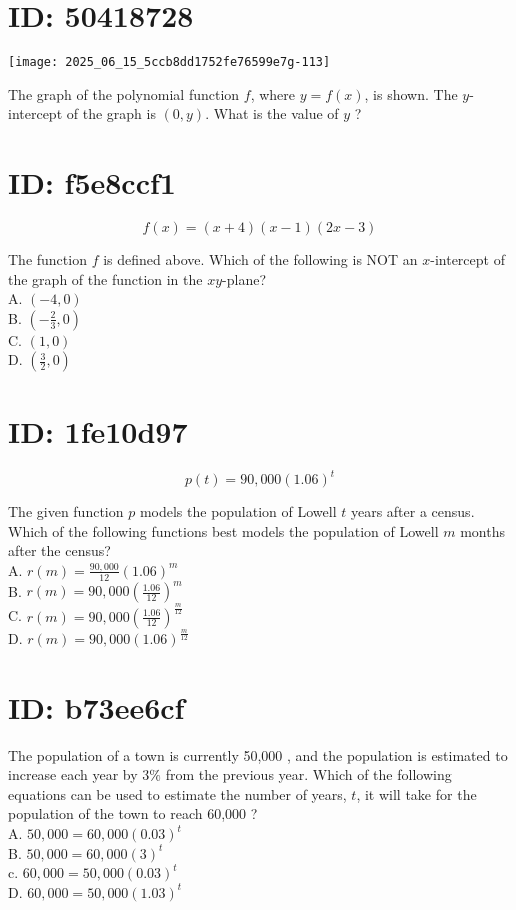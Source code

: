 \section*{ID: 50418728}
\begin{center}
\texttt{[image: 2025\_06\_15\_5ccb8dd1752fe76599e7g-113]}
\end{center}

The graph of the polynomial function $f$, where $y=f(x)$, is shown. The $y$-intercept of the graph is $(0, y)$. What is the value of $y$ ?

\section*{ID: f5e8ccf1}
$$
f(x)=(x+4)(x-1)(2 x-3)
$$

The function $f$ is defined above. Which of the following is NOT an $x$-intercept of the graph of the function in the $x y$-plane?\\
A. $(-4,0)$\\
B. $\left(-\frac{2}{3}, 0\right)$\\
C. $(1,0)$\\
D. $\left(\frac{3}{2}, 0\right)$

\section*{ID: 1fe10d97}
$$
p(t)=90,000(1.06)^{t}
$$

The given function $p$ models the population of Lowell $t$ years after a census. Which of the following functions best models the population of Lowell $m$ months after the census?\\
A. $r(m)=\frac{90,000}{12}(1.06)^{m}$\\
B. $r(m)=90,000\left(\frac{1.06}{12}\right)^{m}$\\
C. $r(m)=90,000\left(\frac{1.06}{12}\right)^{\frac{m}{12}}$\\
D. $r(m)=90,000(1.06)^{\frac{m}{12}}$

\section*{ID: b73ee6cf}
The population of a town is currently 50,000 , and the population is estimated to increase each year by $3 \%$ from the previous year. Which of the following equations can be used to estimate the number of years, $t$, it will take for the population of the town to reach 60,000 ?\\
A. $50,000=60,000(0.03)^{t}$\\
B. $50,000=60,000(3)^{t}$\\
c. $60,000=50,000(0.03)^{t}$\\
D. $60,000=50,000(1.03)^{t}$

